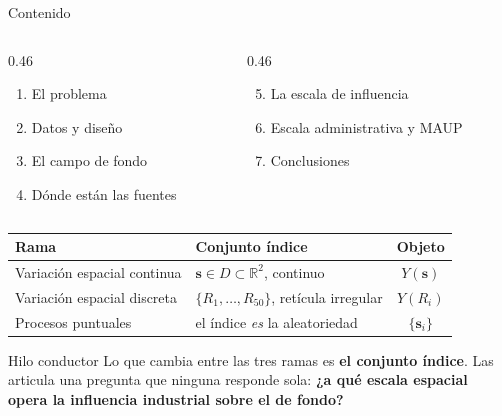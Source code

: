 \documentclass[11pt,aspectratio=169]{beamer}
\newcommand{\dom}{D}                         %
\newcommand{\loc}{\bm{s}}                    %
\newcommand{\loci}[1]{\bm{s}_{#1}}           %
\newcommand{\Yp}[1]{Y(#1)}                   %
\begin{document}
\begin{frame}{Contenido}
\vspace{-5mm}
\begin{columns}[T]
\begin{column}{0.46\textwidth}
\small
\begin{enumerate}
  \item El problema
  \item Datos y diseño
  \item El campo de fondo
  \item Dónde están las fuentes
\end{enumerate}
\end{column}
\begin{column}{0.46\textwidth}
\small
\begin{enumerate}
  \setcounter{enumi}{4}
  \item La escala de influencia
  \item Escala administrativa y MAUP
  \item Conclusiones
\end{enumerate}
\end{column}
\end{columns}

\vspace{3mm}
\centering
\scriptsize
\begin{tabular}{@{}llc@{}}
\toprule
\textbf{Rama} & \textbf{Conjunto índice} & \textbf{Objeto} \\
\midrule
Variación espacial continua & $\loc \in \dom \subset \mathbb{R}^2$, continuo
  & $\Yp{\loc}$ \\
Variación espacial discreta & $\{R_1,\dots,R_{50}\}$, retícula irregular
  & $\Yp{R_i}$ \\
Procesos puntuales & el índice \emph{es} la aleatoriedad & $\{\loci{i}\}$ \\
\bottomrule
\end{tabular}

\vspace{3mm}
\begin{block}{Hilo conductor}
\footnotesize
Lo que cambia entre las tres ramas es \textbf{el conjunto índice}. Las articula
una pregunta que ninguna responde sola: \textbf{¿a qué escala espacial opera la
influencia industrial sobre el  de fondo?}
\end{block}
\end{frame}

\end{document}
